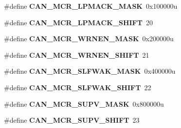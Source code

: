\begin{DoxyCompactItemize}
\item 
\hypertarget{group___c_a_n___register___masks_ga599f0c162d665f019269aace68e3fb17}{}\#define {\bfseries C\+A\+N\+\_\+\+M\+C\+R\+\_\+\+L\+P\+M\+A\+C\+K\+\_\+\+M\+A\+S\+K}~0x100000u\label{group___c_a_n___register___masks_ga599f0c162d665f019269aace68e3fb17}

\item 
\hypertarget{group___c_a_n___register___masks_ga3bd209cf2829ba4c96fc00ec18c6e2d6}{}\#define {\bfseries C\+A\+N\+\_\+\+M\+C\+R\+\_\+\+L\+P\+M\+A\+C\+K\+\_\+\+S\+H\+I\+F\+T}~20\label{group___c_a_n___register___masks_ga3bd209cf2829ba4c96fc00ec18c6e2d6}

\item 
\hypertarget{group___c_a_n___register___masks_ga235a7c2b04cfd0765fa2a9313fc1fcd1}{}\#define {\bfseries C\+A\+N\+\_\+\+M\+C\+R\+\_\+\+W\+R\+N\+E\+N\+\_\+\+M\+A\+S\+K}~0x200000u\label{group___c_a_n___register___masks_ga235a7c2b04cfd0765fa2a9313fc1fcd1}

\item 
\hypertarget{group___c_a_n___register___masks_ga728f73a79721a9cc4b1b82ce6eaa74a7}{}\#define {\bfseries C\+A\+N\+\_\+\+M\+C\+R\+\_\+\+W\+R\+N\+E\+N\+\_\+\+S\+H\+I\+F\+T}~21\label{group___c_a_n___register___masks_ga728f73a79721a9cc4b1b82ce6eaa74a7}

\item 
\hypertarget{group___c_a_n___register___masks_gacf4f1d3d5d5eccf0f03f5f5ed4dc1bba}{}\#define {\bfseries C\+A\+N\+\_\+\+M\+C\+R\+\_\+\+S\+L\+F\+W\+A\+K\+\_\+\+M\+A\+S\+K}~0x400000u\label{group___c_a_n___register___masks_gacf4f1d3d5d5eccf0f03f5f5ed4dc1bba}

\item 
\hypertarget{group___c_a_n___register___masks_ga8dc0878396e4d4e4b73deec9cf23b0b1}{}\#define {\bfseries C\+A\+N\+\_\+\+M\+C\+R\+\_\+\+S\+L\+F\+W\+A\+K\+\_\+\+S\+H\+I\+F\+T}~22\label{group___c_a_n___register___masks_ga8dc0878396e4d4e4b73deec9cf23b0b1}

\item 
\hypertarget{group___c_a_n___register___masks_ga00521c6adbee738b0f73380052600203}{}\#define {\bfseries C\+A\+N\+\_\+\+M\+C\+R\+\_\+\+S\+U\+P\+V\+\_\+\+M\+A\+S\+K}~0x800000u\label{group___c_a_n___register___masks_ga00521c6adbee738b0f73380052600203}

\item 
\hypertarget{group___c_a_n___register___masks_ga5a448e496f0243c035ddcb70b8a07c4e}{}\#define {\bfseries C\+A\+N\+\_\+\+M\+C\+R\+\_\+\+S\+U\+P\+V\+\_\+\+S\+H\+I\+F\+T}~23\label{group___c_a_n___register___masks_ga5a448e496f0243c035ddcb70b8a07c4e}


\end{DoxyCompactItemize}
